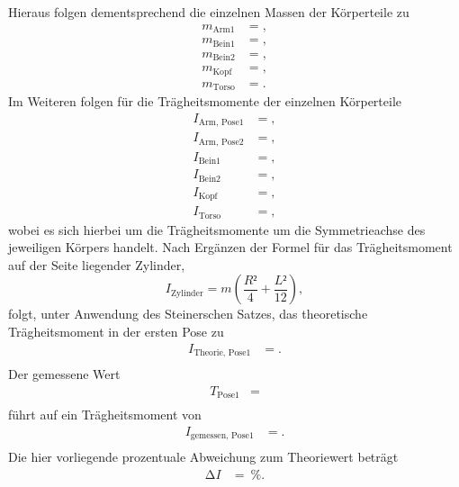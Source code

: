 Hieraus folgen dementsprechend die einzelnen Massen der Körperteile zu
\begin{align*}
  m_{\text{Arm1}}  &= , \\
  m_{\text{Bein1}}  &= , \\
  m_{\text{Bein2}}  &= , \\
  m_{\text{Kopf}}  &= , \\
  m_{\text{Torso}}  &= .
\end{align*}
Im Weiteren folgen für die Trägheitsmomente der einzelnen Körperteile
\begin{align*}
  I_{\text{Arm, Pose1}}  &= , \\
  I_{\text{Arm, Pose2}}  &= , \\
  I_{\text{Bein1}}  &= , \\
  I_{\text{Bein2}}  &= , \\
  I_{\text{Kopf}}  &= , \\
  I_{\text{Torso}}  &= ,
\end{align*}
wobei es sich hierbei um die Trägheitsmomente um die Symmetrieachse des jeweiligen Körpers handelt.
Nach Ergänzen der Formel für das Trägheitsmoment auf der Seite liegender Zylinder,
\begin{equation}
  I_{\text{Zylinder}} = m \left( \frac{R²}{4} + \frac{L²}{12} \right),
\end{equation}
folgt, unter Anwendung des Steinerschen Satzes, das theoretische Trägheitsmoment in der ersten Pose zu
\begin{align*}
  I_{\text{Theorie, Pose1}}  &= . \\
\end{align*}
Der gemessene Wert
\begin{align*}
  T_{\text{Pose1}}  &=  \\
\end{align*}
führt auf ein Trägheitsmoment von
\begin{align*}
  I_{\text{gemessen, Pose1}}  &= . \\
\end{align*}
Die hier vorliegende prozentuale Abweichung zum Theoriewert beträgt
\begin{align*}
  \increment I  &= \:\si{\percent}. \\
\end{align*}

